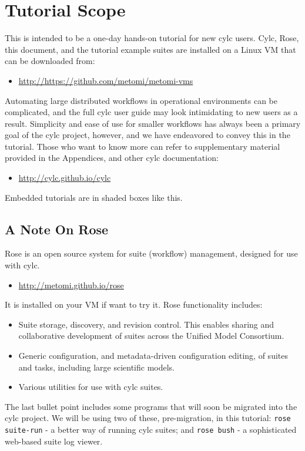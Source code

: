\section{Tutorial Scope}

This is intended to be a one-day hands-on tutorial for new cylc users.  Cylc,
Rose, this document, and the tutorial example suites are installed on a
Linux VM that can be downloaded from:
\begin{itemize}
    \item \url{http://https://github.com/metomi/metomi-vms}
\end{itemize}

Automating large distributed workflows in operational environments can be
complicated, and the full cylc user guide may look intimidating to new users as
a result.  Simplicity and ease of use for smaller workflows has always been a
primary goal of the cylc project, however, and we have endeavored to convey
this in the tutorial. Those who want to know more can refer to supplementary
material provided in the Appendices, and other cylc documentation:

\begin{itemize}
    \item \url{http://cylc.github.io/cylc}
\end{itemize}



\begin{shaded*}
Embedded tutorials are in shaded boxes like this.
\end{shaded*}

\subsection{A Note On Rose}

Rose is an open source system for suite (workflow) management, designed for use
with cylc.
\begin{itemize}
     \item \url{http://metomi.github.io/rose}
\end{itemize}
 
It is installed on your VM if want to try it.  Rose functionality
includes:
\begin{itemize}
    \item Suite storage, discovery, and revision control.  This enables sharing
        and collaborative development of suites across the Unified Model
        Consortium.
    \item Generic configuration, and metadata-driven configuration editing, of
        suites and tasks, including large scientific models.
    \item Various utilities for use with cylc suites.
\end{itemize}

The last bullet point includes some programs that will soon be migrated into
the cylc project.  We will be using two of these, pre-migration, in this
tutorial: \lstinline{rose suite-run} - a better way of running cylc suites; and
\lstinline{rose bush} - a sophisticated web-based suite log viewer.
